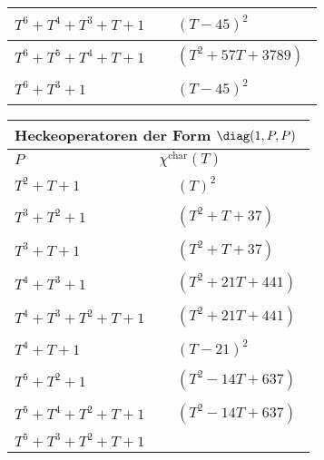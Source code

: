 \begin{tabular}{| l | l |}
\hline
$T^6 + T^4 + T^3 + T + 1$ &
$\!\begin{aligned}
	&(T - 45)^{2}\end{aligned}$ \\
\hline
$T^6 + T^5 + T^4 + T + 1$ &
$\!\begin{aligned}
	&(T^{2} + 57T + 3789)\end{aligned}$ \\
\hline
$T^6 + T^3 + 1$ &
$\!\begin{aligned}
	&(T - 45)^{2}\end{aligned}$ \\
\hline
\end{tabular}


\begin{tabular}{| l | l |}
\multicolumn{2}{l}{\bf Heckeoperatoren der Form $\diag(1,P,P)$} \\
\hline
$P$ & $\chi^\text{char}(T)$ \\
\hline
$T^2 + T + 1$ &
$\!\begin{aligned}
	&(T)^{2}\end{aligned}$ \\
\hline
$T^3 + T^2 + 1$ &
$\!\begin{aligned}
	&(T^{2} + T + 37)\end{aligned}$ \\
\hline
$T^3 + T + 1$ &
$\!\begin{aligned}
	&(T^{2} + T + 37)\end{aligned}$ \\
\hline
$T^4 + T^3 + 1$ &
$\!\begin{aligned}
	&(T^{2} + 21T + 441)\end{aligned}$ \\
\hline
$T^4 + T^3 + T^2 + T + 1$ &
$\!\begin{aligned}
	&(T^{2} + 21T + 441)\end{aligned}$ \\
\hline
$T^4 + T + 1$ &
$\!\begin{aligned}
	&(T - 21)^{2}\end{aligned}$ \\
\hline
$T^5 + T^2 + 1$ &
$\!\begin{aligned}
	&(T^{2} - 14T + 637)\end{aligned}$ \\
\hline
$T^5 + T^4 + T^2 + T + 1$ &
$\!\begin{aligned}
	&(T^{2} - 14T + 637)\end{aligned}$ \\
\hline
$T^5 + T^3 + T^2 + T + 1$ &

\end{tabular}
